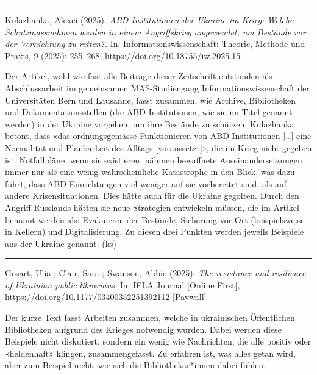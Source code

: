 \documentclass[a4paper,
fontsize=11pt,
oneside,
numbers=noperiodatend,
parskip=half-,
bibliography=totoc,
final
]{scrartcl}
\begin{document}
\begin{center}\rule{0.5\linewidth}{0.5pt}\end{center}

Kulazhanka, Alexei (2025). \emph{ABD-Institutionen der Ukraine im Krieg:
Welche Schutzmassnahmen werden in einem Angriffskrieg angewendet, um
Bestände vor der Vernichtung zu retten?}. In: Informationswissenschaft:
Theorie, Methode und Praxis, 9 (2025): 255--268,
\url{https://doi.org/10.18755/iw.2025.15}

Der Artikel, wohl wie fast alle Beiträge dieser Zeitschrift entstanden
als Abschlussarbeit im gemeinsamen MAS-Studiengang
Informationswissenschaft der Universitäten Bern und Lausanne, fasst
zusammen, wie Archive, Bibliotheken und Dokumentationsstellen (die
ABD-Institutionen, wie sie im Titel genannt werden) in der Ukraine
vorgehen, um ihre Bestände zu schützen. Kulazhanka betont, dass «das
ordnungsgemässe Funktionieren von ABD-Institutionen {[}\ldots{]} eine
Normalität und Planbarkeit des Alltags {[}voraussetzt{]}», die im Krieg
nicht gegeben ist. Notfallpläne, wenn sie existieren, nähmen bewaffnete
Auseinandersetzungen immer nur als eine wenig wahrscheinliche
Katastrophe in den Blick, was dazu führt, dass ABD-Einrichtungen viel
weniger auf sie vorbereitet sind, als auf andere Krisensituationen. Dies
hätte auch für die Ukraine gegolten. Durch den Angriff Russlands hätten
sie neue Strategien entwickeln müssen, die im Artikel benannt werden
als: Evakuieren der Bestände, Sicherung vor Ort (beispielsweise in
Kellern) und Digitalisierung. Zu diesen drei Punkten werden jeweils
Beispiele aus der Ukraine genannt. (ks)

\begin{center}\rule{0.5\linewidth}{0.5pt}\end{center}

Gosart, Ulia ; Clair, Sara ; Swanson, Abbie (2025). \emph{The resistance
and resilience of Ukrainian public librarians}. In: IFLA Journal
{[}Online First{]}, \url{https://doi.org/10.1177/03400352251392112}
{[}Paywall{]}

Der kurze Text fasst Arbeiten zusammen, welche in ukrainischen
Öffentlichen Bibliotheken aufgrund des Krieges notwendig wurden. Dabei
werden diese Beispiele nicht diskutiert, sondern ein wenig wie
Nachrichten, die alle positiv oder «heldenhaft» klingen,
zusammengefasst. Zu erfahren ist, was alles getan wird, aber zum
Beispiel nicht, wie sich die Bibliothekar*innen dabei fühlen.
\end{document}
